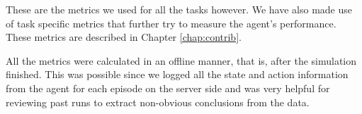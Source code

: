 These are the metrics we used for all the tasks however. 
We have also made use of task specific metrics that further try to measure the agent's performance.
These metrics are described in Chapter \ref{chap:contrib}.

All the metrics were calculated in an offline manner, that is, after the simulation finished.
This was possible since we logged all the state and action information from the agent for each episode on the server side
and was very helpful for reviewing past runs to extract non-obvious conclusions from the data.
